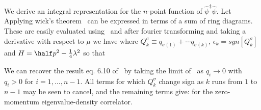 

We derive 
an integral representation for 
the $n$-point function of $\hat\psi^\dagger\hat\psi$.
Let 
\eqn{}
Applying wick's theorem \gfns\ can be expressed in terms of 
a sum of ring diagrams. 
These are easily evaluated using 
\propeuc\ and after fourier transforming and taking a 
derivative with respect to $\mu$ we have 
\eqn{}
where $Q_k^\sigma\equiv q_{\sigma(1)}+\cdots q_{\sigma(k)}$,
$\epsilon_k=sgn[Q^\sigma_k]$ and $H=\half p^2
-{1\over 4}\lambda^2$ so that
\eqn{}

We can recover the result eq. 6.10 of 
\gk\ 
by taking the limit of \nptev\ 
as $q_i\to 0$ with $q_i>0$ for $i=1,\dots, n-1$. All terms for which 
$Q_k^\sigma$ change sign as $k$ runs from $1$ to $n-1$
may be seen to cancel, and the remaining terms give:
\eqn{}
for the zero-momentum eigenvalue-density correlator.

 
